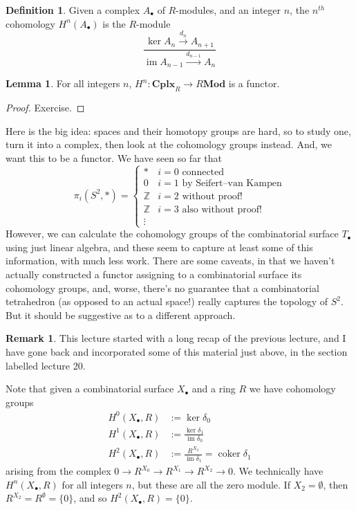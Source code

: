 \documentclass{tufte-handout}
\def\Mod {\mathbf{Mod}}
\def\Cplx{\mathbf{Cplx}}
\def\ZZ{\mathbb{Z}}
\newcommand{\lecturenum}[1]{\marginnote{\color{red}Lecture #1}}
\DeclareMathOperator{\coker}{coker}
\DeclareMathOperator{\im}{im}
\theoremstyle{definition}
\newtheorem{lemma}{Lemma}
\newtheorem{definition}{Definition}
\newtheorem*{rem}{Remark}
\begin{document}
\begin{definition}
Given a complex $A_\bullet$ of $R$-modules, and an integer $n$, the $n^{th}$ cohomology 
$H^n(A_\bullet)$ is the $R$-module
\[
\frac{\ker A_n \xrightarrow{d_n} A_{n+1}}{\im A_{n-1} \xrightarrow{d_{n-1}} A_n}
\]
\end{definition}

\begin{lemma}
For all integers $n$, $H^n \colon \Cplx_R \to R\Mod$ is a functor.
\end{lemma}

\begin{proof}
Exercise.
\end{proof}

Here is the big idea: spaces and their homotopy groups are hard, so to study one, turn 
it into a complex, then look at the cohomology groups instead. And, we want this 
to be a functor. We have seen so far that
\[
\pi_i(S^2,*) = \begin{cases}
* & i=0\text{ connected}\\
0 & i=1\text{ by Seifert--van~Kampen}\\
\ZZ & i=2\text{ without proof!}\\
\ZZ & i=3\text{ also without proof!}\\
\vdots &
\end{cases}
\]
However, we can calculate the cohomology groups of the combinatorial surface $T_\bullet$ using
just linear algebra, and these seem to capture at least some of this information, with much less
work. There are some caveats, in that we haven't actually constructed a functor assigning to
a combinatorial surface its cohomology groups, and, worse, there's no guarantee that a 
combinatorial tetrahedron (as opposed to an actual space!) really captures the topology of $S^2$.
But it should be suggestive as to a different approach.

\begin{rem}
This\lecturenum{21} lecture started with a long recap of the previous lecture, and I have
gone back and incorporated some of this material just above, in the section labelled 
lecture 20.
\end{rem}

Note that given a combinatorial surface $X_\bullet$ and a ring $R$ we have cohomology groups
\begin{align*}
H^0(X_\bullet,R) & := \ker\delta_0\\
H^1(X_\bullet,R) & := \frac{\ker\delta_1}{\im\delta_0}\\
H^2(X_\bullet,R) & := \frac{R^{X_2}}{\im\delta_1} = \coker\delta_1
\end{align*}
arising from the complex $0\to R^{X_0} \to R^{X_1} \to R^{X_2} \to 0$. We technically have 
$H^n(X_\bullet,R)$ for all integers $n$, but these are all the zero module. 
If $X_2=\emptyset$, then $R^{X_2} = R^\emptyset = \{0\}$, and so $H^2(X_\bullet,R) = \{0\}$.
\end{document}
